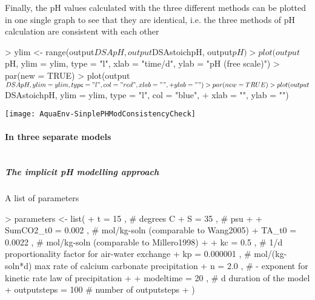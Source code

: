 \documentclass[article,nojss]{jss}
\begin{document}
Finally, the pH values calculated with the three different methods can be plotted in one single graph to see that they are identical, i.e. the three 
methods of pH calculation are consistent with each other

\begin{Schunk}
\begin{Sinput}
> ylim <- range(output$DSApH, output$DSAstoichpH, output$pH)
> plot(output$pH, ylim = ylim, type = "l", xlab = "time/d", ylab = "pH (free scale)")
> par(new = TRUE)
> plot(output$DSApH, ylim = ylim, type = "l", col = "red", xlab = "", 
+     ylab = "")
> par(new = TRUE)
> plot(output$DSAstoichpH, ylim = ylim, type = "l", col = "blue", 
+     xlab = "", ylab = "")
\end{Sinput}
\end{Schunk}
\texttt{[image: AquaEnv-SinplePHModConsistencyCheck]}


\paragraph{In three separate models} $\;$\\


\subparagraph{The implicit pH modelling approach}$\,$\\
           
A list of parameters
\begin{scriptsize}
\begin{Schunk}
\begin{Sinput}
> parameters <- list(             
+     t           = 15        , # degrees C
+     S           = 35        , # psu       
+ 
+     SumCO2_t0   = 0.002     , # mol/kg-soln  (comparable to Wang2005)
+     TA_t0       = 0.0022    , # mol/kg-soln  (comparable to Millero1998)
+ 
+     kc          = 0.5       , # 1/d	         proportionality factor for air-water exchange
+     kp          = 0.000001  , # mol/(kg-soln*d)	 max rate of calcium carbonate precipitation
+     n           = 2.0       , # -                 exponent for kinetic rate law of precipitation
+                                       
+     modeltime   = 20        , # d              duration of the model
+     outputsteps = 100         #                number of outputsteps
+                    )
\end{Sinput}
\end{Schunk}
\end{scriptsize}
\end{document}
